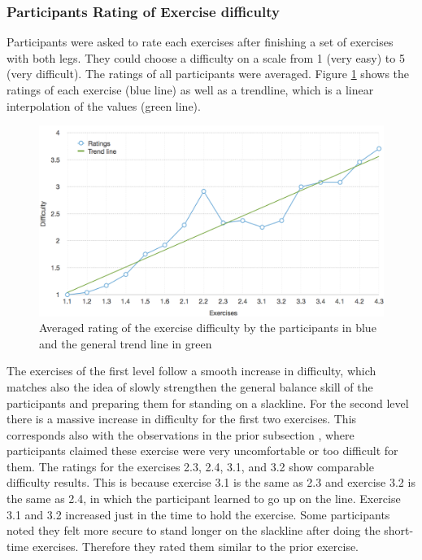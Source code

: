 \subsubsection{Participants Rating of Exercise difficulty}
Participants were asked to rate each exercises after finishing a set of exercises with both legs.
They could choose a difficulty on a scale from 1 (very easy) to 5 (very difficult).
The ratings of all participants were averaged.
Figure \ref{fig:6_4_exerciseDifficulty} shows the ratings of each exercise (blue line) as well as a trendline, which is a linear interpolation of the values (green line).

\begin{figure}[htb]
	\centering
	\begin{minipage}[t]{0.92\linewidth}
		\centering
		\includegraphics[width=1\linewidth]{Pictures/6_4_DIA_ExerciseDifficulty1}
		\caption{Averaged rating of the exercise difficulty by the participants in blue and the general trend line in green}
		\label{fig:6_4_exerciseDifficulty}
	\end{minipage}
\end{figure}

The exercises of the first level follow a smooth increase in difficulty, which matches also the idea of slowly strengthen the general balance skill of the participants and preparing them for standing on a slackline.
For the second level there is a massive increase in difficulty for the first two exercises.
This corresponds also with the observations in the prior subsection \textit{}, where participants claimed
these exercise were very uncomfortable or too difficult for them.
The ratings for the exercises 2.3, 2.4, 3.1, and 3.2 show comparable difficulty results.
This is because exercise 3.1 is the same as 2.3 and exercise 3.2 is the same as 2.4, in which the participant learned to go up on the line.
Exercise 3.1 and 3.2 increased just in the time to hold the exercise.
Some participants noted they felt more secure to stand longer on the slackline after doing the short-time exercises.
Therefore they rated them similar to the prior exercise.

